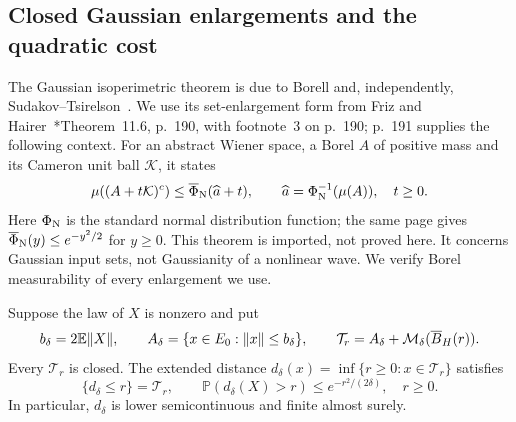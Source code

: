 \subsection{Closed Gaussian enlargements and the quadratic cost}
\label{S:gaussian-isoperimetry-input}

The Gaussian isoperimetric theorem is due to Borell and, independently,
Sudakov--Tsirelson~\cites{borell:75:brunn-minkowski, sudakov.cirel-son:74:extremal}.
We use its set-enlargement form from
Friz and Hairer~\cite{friz.hairer:20:course}*{Theorem~11.6, p.~190}, with footnote~3 on
p.~190; p.~191 supplies the following context. For an abstract Wiener space, a
Borel $A$ of positive mass and its Cameron unit ball $\mathcal{K}$, it states
\[
  \mu((A+t\mathcal{K})^c)
  \le\overline{\Phi}_{\rm N}(\widehat{a}+t),\qquad
  \widehat{a}=\Phi_{\rm N}^{-1}(\mu(A)),\quad t\ge0 .
\]
Here $\Phi_{\rm N}$ is the standard normal distribution function; the same page
gives $\overline{\Phi}_{\rm N}(y) \le e^{-y^2/2}$ for $y \ge 0$. This theorem is
imported, not proved here. It concerns Gaussian input sets, not Gaussianity of a
nonlinear wave. We verify Borel measurability of every enlargement we use.
%
\begin{lemma}
  \label{L:tube-closed-geometry}
  Suppose the law of $X$ is nonzero and put
  \[
    b_\delta=2\mathbb{E}\|X\|,\qquad
    A_\delta=\{x\in E_0:\|x\|\le b_\delta\},\qquad
    \mathcal{T}_r=A_\delta+\mathcal{M}_\delta(\overline{B}_H(r)).
  \]
  Every $\mathcal{T}_r$ is closed. The extended distance $d_\delta(x) =
  \inf\{r\ge0:x\in\mathcal{T}_r\}$ satisfies
  \begin{equation}\label{E:tube-attained-radius}
    \{d_\delta\le r\}=\mathcal{T}_r,\qquad
    \mathbb{P}(d_\delta(X)>r)\le e^{-r^2/(2\delta)},\quad r\ge0 .
  \end{equation}
  In particular, $d_\delta$ is lower semicontinuous and finite almost surely.
\end{lemma}

